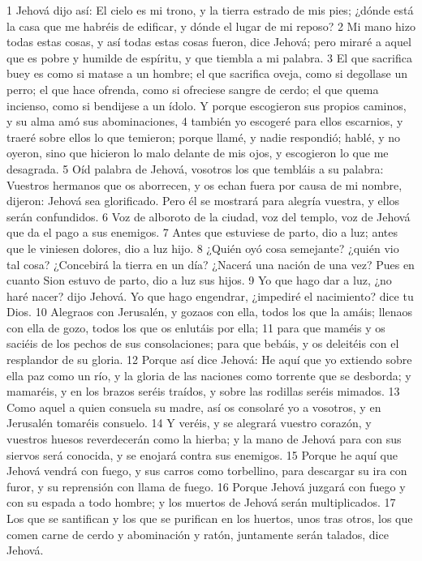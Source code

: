 1 Jehová dijo así: El cielo es mi trono, y la tierra estrado de mis pies; ¿dónde está la casa que me habréis de edificar, y dónde el lugar de mi reposo? 
2 Mi mano hizo todas estas cosas, y así todas estas cosas fueron, dice Jehová; pero miraré a aquel que es pobre y humilde de espíritu, y que tiembla a mi palabra.
3 El que sacrifica buey es como si matase a un hombre; el que sacrifica oveja, como si degollase un perro; el que hace ofrenda, como si ofreciese sangre de cerdo; el que quema incienso, como si bendijese a un ídolo. Y porque escogieron sus propios caminos, y su alma amó sus abominaciones,
4 también yo escogeré para ellos escarnios, y traeré sobre ellos lo que temieron; porque llamé, y nadie respondió; hablé, y no oyeron, sino que hicieron lo malo delante de mis ojos, y escogieron lo que me desagrada.
5 Oíd palabra de Jehová, vosotros los que tembláis a su palabra: Vuestros hermanos que os aborrecen, y os echan fuera por causa de mi nombre, dijeron: Jehová sea glorificado. Pero él se mostrará para alegría vuestra, y ellos serán confundidos.
6 Voz de alboroto de la ciudad, voz del templo, voz de Jehová que da el pago a sus enemigos.
7 Antes que estuviese de parto, dio a luz; antes que le viniesen dolores, dio a luz hijo. 
8 ¿Quién oyó cosa semejante? ¿quién vio tal cosa? ¿Concebirá la tierra en un día? ¿Nacerá una nación de una vez? Pues en cuanto Sion estuvo de parto, dio a luz sus hijos.
9 Yo que hago dar a luz, ¿no haré nacer? dijo Jehová. Yo que hago engendrar, ¿impediré el nacimiento? dice tu Dios.
10 Alegraos con Jerusalén, y gozaos con ella, todos los que la amáis; llenaos con ella de gozo, todos los que os enlutáis por ella;
11 para que maméis y os saciéis de los pechos de sus consolaciones; para que bebáis, y os deleitéis con el resplandor de su gloria.
12 Porque así dice Jehová: He aquí que yo extiendo sobre ella paz como un río, y la gloria de las naciones como torrente que se desborda; y mamaréis, y en los brazos seréis traídos, y sobre las rodillas seréis mimados.
13 Como aquel a quien consuela su madre, así os consolaré yo a vosotros, y en Jerusalén tomaréis consuelo.
14 Y veréis, y se alegrará vuestro corazón, y vuestros huesos reverdecerán como la hierba; y la mano de Jehová para con sus siervos será conocida, y se enojará contra sus enemigos.
15 Porque he aquí que Jehová vendrá con fuego, y sus carros como torbellino, para descargar su ira con furor, y su reprensión con llama de fuego.
16 Porque Jehová juzgará con fuego y con su espada a todo hombre; y los muertos de Jehová serán multiplicados.
17 Los que se santifican y los que se purifican en los huertos, unos tras otros, los que comen carne de cerdo y abominación y ratón, juntamente serán talados, dice Jehová.
